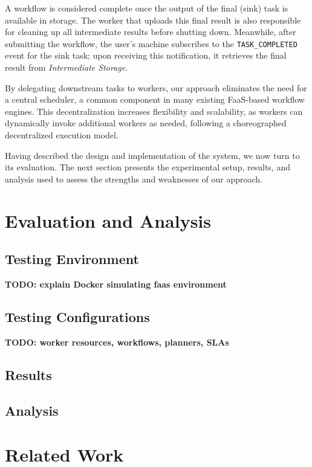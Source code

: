 \documentclass[conference]{IEEEtran}
\begin{document}
A workflow is considered complete once the output of the final (sink) task is available in storage. The worker that uploads this final result is also responsible for cleaning up all intermediate results before shutting down. Meanwhile, after submitting the workflow, the user's machine subscribes to the \texttt{TASK\_COMPLETED} event for the sink task; upon receiving this notification, it retrieves the final result from \textit{Intermediate Storage}.

By delegating downstream tasks to workers, our approach eliminates the need for a central scheduler, a common component in many existing FaaS-based workflow engines. This decentralization increases flexibility and scalability, as workers can dynamically invoke additional workers as needed, following a choreographed decentralized execution model.

Having described the design and implementation of the system, we now turn to its evaluation. The next section presents the experimental setup, results, and analysis used to assess the strengths and weaknesses of our approach.


\section{Evaluation and Analysis}

\subsection{Testing Environment}
\textbf{TODO: explain Docker simulating faas environment}
\subsection{Testing Configurations}
\textbf{TODO: worker resources, workflows, planners, SLAs}
\subsection{Results}
\subsection{Analysis}



\section{Related Work}
\label{s:related_work}
\end{document}
